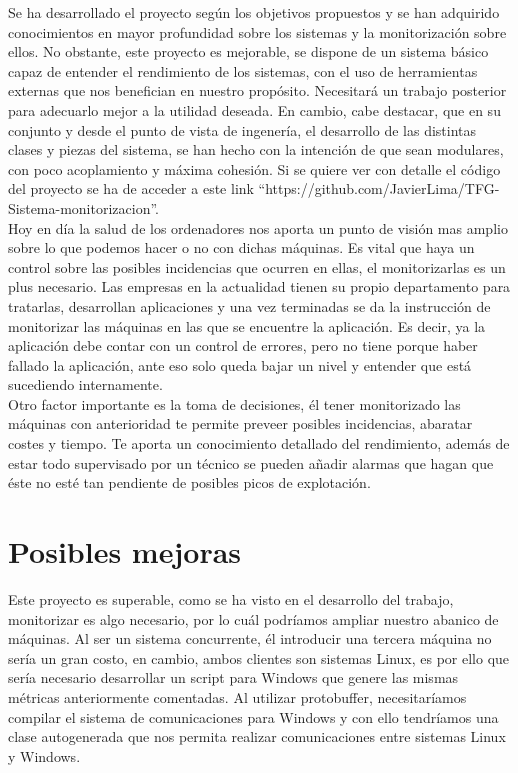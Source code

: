 \documentclass[ spanish, a4paper, 12pt, oneside]{report}
\begin{document}
Se ha desarrollado el proyecto según los objetivos propuestos y se han adquirido conocimientos en mayor profundidad sobre los sistemas y la monitorización sobre ellos. No obstante, este proyecto es mejorable, se dispone de un sistema básico capaz de entender el rendimiento de los sistemas, con el uso de herramientas externas que nos benefician en nuestro propósito. Necesitará un trabajo posterior 
para adecuarlo mejor a la utilidad deseada. En cambio, cabe destacar, que en su conjunto y desde el punto de vista de ingenería, el desarrollo de las distintas clases y piezas del sistema, se han hecho con la intención de que sean modulares, con poco acoplamiento y máxima cohesión. Si se quiere ver con detalle el código del proyecto se ha de acceder a este link ``https://github.com/JavierLima/TFG-Sistema-monitorizacion''. \\

Hoy en día la salud de los ordenadores nos aporta un punto de visión mas amplio sobre lo que podemos hacer o no con dichas máquinas. Es vital que haya un control sobre las posibles incidencias que ocurren en ellas, el monitorizarlas es un plus necesario. Las empresas en la actualidad tienen su propio departamento para tratarlas, desarrollan aplicaciones y una vez terminadas 
se da la instrucción de monitorizar las máquinas en las que se encuentre la aplicación. Es decir, ya la aplicación debe contar con un control de errores, pero no tiene porque haber fallado la aplicación, ante eso solo queda bajar un nivel y entender que está sucediendo internamente.\\

Otro factor importante es la toma de decisiones, él tener monitorizado las máquinas con anterioridad te permite preveer posibles incidencias, abaratar costes y tiempo. Te aporta un conocimiento detallado del rendimiento, además de estar todo supervisado por un técnico se pueden añadir alarmas que hagan que éste no esté tan pendiente de posibles picos de explotación.\\
\section{Posibles mejoras}

Este proyecto es superable, como se ha visto en el desarrollo del trabajo, monitorizar es algo necesario, por lo cuál podríamos ampliar nuestro abanico de máquinas. Al ser un sistema concurrente, él introducir una tercera máquina no sería un gran costo, en cambio, ambos clientes son sistemas Linux, es por ello que sería necesario desarrollar un script para Windows que 
genere las mismas métricas anteriormente comentadas. Al utilizar protobuffer, necesitaríamos compilar el sistema de comunicaciones para Windows y con ello tendríamos una clase autogenerada que nos permita realizar comunicaciones entre sistemas Linux y Windows.\\
\end{document}
